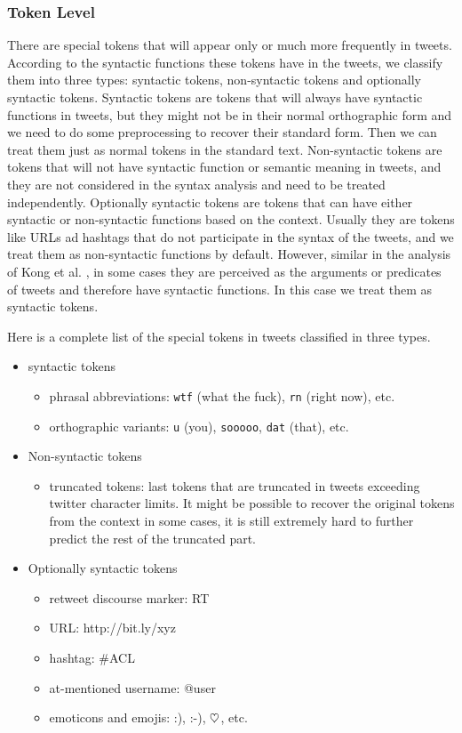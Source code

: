 \documentclass[11pt,letterpaper]{article}
\newcommand{\heart}{\ensuremath\heartsuit}
\begin{document}
\subsubsection{Token Level}

There are special tokens that will appear only or much more frequently in tweets. According to the syntactic functions these tokens have in the tweets, we classify them into three types: syntactic tokens, non-syntactic tokens and optionally syntactic tokens. 
Syntactic tokens are tokens that will always have syntactic functions in tweets, but they might not be in their normal orthographic form and we need to do some preprocessing to recover their standard form. Then we can treat them just as normal tokens in the standard text.
Non-syntactic tokens are tokens that will not have syntactic function or semantic meaning in tweets, and they are not considered in the syntax analysis and need to be treated independently.
Optionally syntactic tokens are tokens that can have either syntactic or non-syntactic functions based on the context. Usually they are tokens like URLs ad hashtags that do not participate in the syntax of the tweets, and we treat them as non-syntactic functions by default. However, similar in the analysis of Kong et al. , in some cases they are perceived as the arguments or predicates of tweets and therefore have syntactic functions. In this case we treat them as syntactic tokens.

Here is a complete list of the special tokens in tweets classified in three types.

\begin{itemize}
\item syntactic tokens
	\begin{itemize}
		\item phrasal abbreviations: {\tt wtf} (what the fuck), {\tt rn} (right now), etc.
		\item orthographic variants: {\tt u} (you), {\tt sooooo}, {\tt dat} (that), etc.
	\end{itemize}
\item Non-syntactic tokens
	\begin{itemize}
		\item truncated tokens: last tokens that are truncated in tweets exceeding twitter character limits. It might be possible to recover the original tokens from the context in some cases, it is still extremely hard to further predict the rest of the truncated part.
	\end{itemize}
\item Optionally syntactic tokens
	\begin{itemize}
		\item retweet discourse marker: RT
		\item URL: http://bit.ly/xyz
		\item hashtag: \#ACL
		\item at-mentioned username: @user
		\item emoticons and emojis: :), :-), $\heart$, etc.
	\end{itemize}
\end{itemize}
\end{document}
